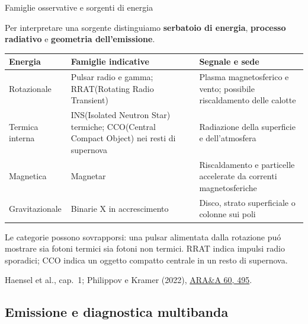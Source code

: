 
\begin{frame}[t]{Famiglie osservative e sorgenti di energia}
\small\raggedright
Per interpretare una sorgente distinguiamo \textbf{serbatoio di energia},
\textbf{processo radiativo} e \textbf{geometria dell'emissione}.
\begin{tabular}{|p{}|p{}|p{}|}
\hline
\textbf{Energia} & \textbf{Famiglie indicative} & \textbf{Segnale e sede} \\
\hline
Rotazionale & Pulsar radio e gamma; RRAT(Rotating Radio Transient) & Plasma magnetosferico e vento; possibile riscaldamento delle calotte \\
\hline
Termica interna & INS(Isolated Neutron Star) termiche; CCO(Central Compact Object) nei resti di supernova & Radiazione della superficie e dell'atmosfera \\
\hline
Magnetica & Magnetar & Riscaldamento e particelle accelerate da correnti magnetosferiche \\
\hline
Gravitazionale & Binarie X in accrescimento & Disco, strato superficiale o colonne sui poli \\
\hline
\end{tabular}
Le categorie possono sovrapporsi: una pulsar alimentata dalla rotazione
pu\'o mostrare sia fotoni termici sia fotoni non termici.
RRAT indica impulsi radio sporadici; CCO indica un oggetto compatto centrale
in un resto di supernova.
\par\smallskip
\footnotesize Haensel et al., cap.~1; Philippov e Kramer (2022),
\href{https://doi.org/10.1146/annurev-astro-052920-112338}{ARA\&A 60, 495}.
\end{frame}

\subsection{Emissione e diagnostica multibanda}

